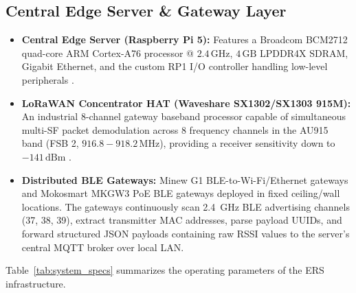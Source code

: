 \subsection{Central Edge Server \& Gateway Layer}
\begin{itemize}
    \item \textbf{Central Edge Server (Raspberry Pi 5):} Features a Broadcom BCM2712 quad-core ARM Cortex-A76 processor @ $2.4\,\text{GHz}$, $4\,\text{GB}$ LPDDR4X SDRAM, Gigabit Ethernet, and the custom RP1 I/O controller handling low-level peripherals \cite{rpi5_datasheet}.
    \item \textbf{LoRaWAN Concentrator HAT (Waveshare SX1302/SX1303 915M):} An industrial 8-channel gateway baseband processor capable of simultaneous multi-SF packet demodulation across 8 frequency channels in the AU915 band (FSB 2, $916.8-918.2\,\text{MHz}$), providing a receiver sensitivity down to $-141\,\text{dBm}$ \cite{semtech_sx1302}.
    \item \textbf{Distributed BLE Gateways:} Minew G1 BLE-to-Wi-Fi/Ethernet gateways and Mokosmart MKGW3 PoE BLE gateways deployed in fixed ceiling/wall locations. The gateways continuously scan 2.4~GHz BLE advertising channels (37, 38, 39), extract transmitter MAC addresses, parse payload UUIDs, and forward structured JSON payloads containing raw RSSI values to the server's central MQTT broker over local LAN.
\end{itemize}

Table~\ref{tab:system_specs} summarizes the operating parameters of the ERS infrastructure.

